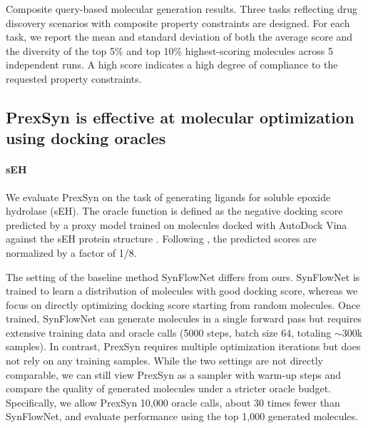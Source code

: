 \begin{table}[tb]
  \small
  \caption{
    Composite query-based molecular generation results.
    Three tasks reflecting drug discovery scenarios with composite property constraints are designed.
    For each task, we report the mean and standard deviation of both the average score and the diversity of the top 5\% and top 10\% highest-scoring molecules across 5 independent runs. A high score indicates a high degree of compliance to the requested property constraints.
  }
  \label{tab:query}
  \centering
  \begin{adjustbox}{max width=1\textwidth}
  
  \end{adjustbox}
\end{table}


\subsection{PrexSyn is effective at molecular optimization using docking oracles}

\paragraph{sEH}
We evaluate PrexSyn on the task of generating ligands for soluble epoxide hydrolase (sEH).
The oracle function is defined as the negative docking score predicted by a proxy model trained on molecules docked with AutoDock Vina against the sEH protein structure \citep{cretu2024synflownet,bengio2021flow}.
Following \cite{cretu2024synflownet}, the predicted scores are normalized by a factor of 1/8.

The setting of the baseline method SynFlowNet \citep{cretu2024synflownet} differs from ours. SynFlowNet is trained to learn a distribution of molecules with good docking score, whereas we focus on directly optimizing docking score starting from random molecules. Once trained, SynFlowNet can generate molecules in a single forward pass but requires extensive training data and oracle calls (5000 steps, batch size 64, totaling $\sim$300k samples). In contrast, PrexSyn requires multiple optimization iterations but does not rely on any training samples. While the two settings are not directly comparable, we can still view PrexSyn as a sampler with warm-up steps and compare the quality of generated molecules under a stricter oracle budget. 
Specifically, we allow PrexSyn 10,000 oracle calls, about 30 times fewer than SynFlowNet, and evaluate performance using the top 1,000 generated molecules.

